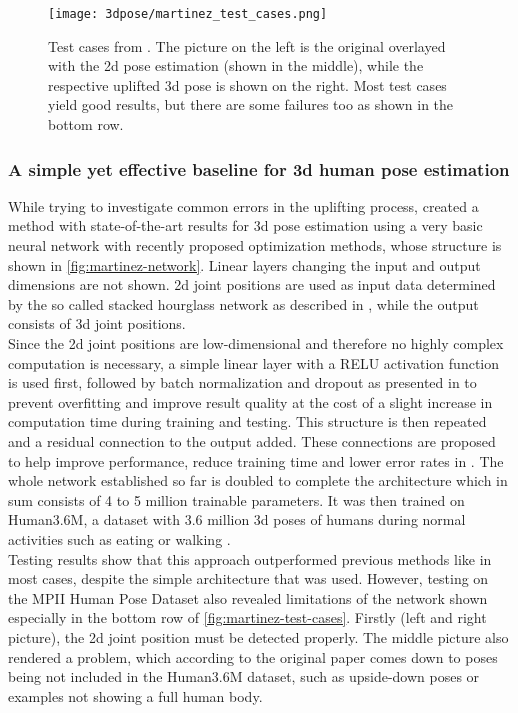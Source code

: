 \begin{figure*}[!htb]
	\centering
	\texttt{[image: 3dpose/martinez\_test\_cases.png]}
	\caption{Test cases from \cite{Martinez_2017_ICCV}. The picture on the left is the original overlayed with the 2d pose estimation (shown in the middle), while the respective uplifted 3d pose is shown on the right. Most test cases yield good results, but there are some failures too as shown in the bottom row.}
	\label{fig:martinez-test-cases}
\end{figure*}

\subsubsection{A simple yet effective baseline for 3d human pose estimation}
\label{sec:simple-yet-effective-baseline}
While trying to investigate common errors in the uplifting process, \cite{Martinez_2017_ICCV} created a method with state-of-the-art results for 3d pose estimation using a very basic neural network with recently proposed optimization methods, whose structure is shown in \autoref{fig:martinez-network}. Linear layers changing the input and output dimensions are not shown. 2d joint positions are used as input data determined by the so called stacked hourglass network as described in \cite{Newell2016}, while the output consists of 3d joint positions.\\
 Since the 2d joint positions are low-dimensional and therefore no highly complex computation is necessary, a simple linear layer with a RELU activation function is used first, followed by batch normalization and dropout as presented in \cite{srivastava2014} to prevent overfitting and improve result quality at the cost of a slight increase in computation time during training and testing. This structure is then repeated and a residual connection to the output added. These connections are proposed to help improve performance, reduce training time and lower error rates in \cite{HeZRS15}. The whole network established so far is doubled to complete the architecture which in sum consists of 4 to 5 million trainable parameters. It was then trained on Human3.6M, a dataset with 3.6 million 3d poses of humans during normal activities such as eating or walking \cite{H3.6M}.\\ Testing results show that this approach outperformed previous methods like \cite{PavlakosZDD16} in most cases, despite the simple architecture that was used. However, testing on the MPII Human Pose Dataset \cite{andriluka14cvpr} also revealed limitations of the network shown especially in the bottom row of \autoref{fig:martinez-test-cases}. Firstly (left and right picture), the 2d joint position must be detected properly. The middle picture also rendered a problem, which according to the original paper comes down to poses being not included in the Human3.6M dataset, such as upside-down poses or examples not showing a full human body.\\
